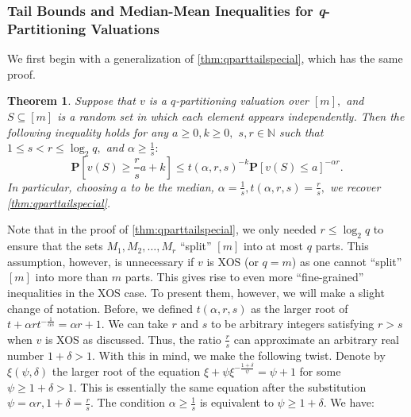 \documentclass[11pt]{article}%
\newtheorem{theorem}{Theorem}
\numberwithin{theorem}{subsection}
\newcommand{\prob}{\mathbf{P}}
\def\hmath$#1${\texorpdfstring{{\rmfamily\textit{#1}}}{#1}}
\begin{document}
\subsubsection{Tail Bounds and Median-Mean Inequalities for \hmath$q$-Partitioning Valuations}
We first begin with a generalization of \cref{thm:qparttailspecial}, which has the same proof. 
\begin{theorem}
\label{thm:qparttail}
Suppose that $v$ is a $q$-partitioning valuation over $[m],$ and $S\subseteq [m]$ is a random set in which each element appears independently. Then the following inequality holds for any $ a \ge 0, k\ge 0,$ $s,r\in \mathbb{N}$ such that $1\le s < r\le \log_2 q,$ and $\alpha \ge \frac{1}{s}:$  
    $$
    \prob[v(S)\ge \frac{r}{s}a+k]\le 
    t(\alpha, r, s)^{-k}\prob[v(S)\le a]^{-\alpha r}.
    $$
    In particular, choosing $a$ to be the median, $\alpha = \frac{1}{s}, t(\alpha, r, s) = \frac{r}{s},$ we recover \cref{thm:qparttailspecial}.
\end{theorem}

\noindent
Note that in the proof of \cref{thm:qparttailspecial}, we only needed $r\le \log_2 q$ to ensure that the sets $M_1, M_2, \ldots, M_r$ ``split'' $[m]$ into at most $q$ parts. This assumption, however, is unnecessary if $v$ is XOS (or $q = m$) as one cannot ``split'' $[m]$ into more than $m$ parts. This gives rise to even more ``fine-grained'' inequalities in the XOS case. To present them, however, we will make a slight change of notation. Before, we defined $t(\alpha, r,s)$ as the larger root of $t + \alpha r t^{-\frac{1}{\alpha s}} = \alpha r + 1.$
We can take $r$ and $s$ to be arbitrary integers satisfying $r>s$ when $v$ is XOS as discussed. Thus, the ratio $\frac{r}{s}$ can approximate an arbitrary real number $1+ \delta > 1.$ With this in mind, we make the following twist. Denote by $\xi(\psi, \delta)$ the larger root of the equation $\xi + \psi \xi^{-\frac{1+\delta}{\psi}} = \psi+1$ for some $\psi \ge 1+\delta >1.$ This is essentially the same equation after the substitution $\psi =\alpha r, 1+ \delta = \frac{r}{s}.$ The condition $\alpha \ge \frac{1}{s}$ is equivalent to $\psi \ge 1+\delta.$
We have:
\end{document}

